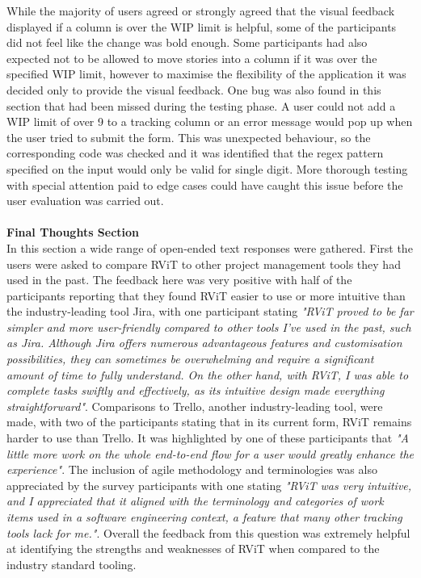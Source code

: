 \documentclass[l4proj.tex]{subfiles}
\begin{document}
While the majority of users agreed or strongly agreed that the visual feedback displayed if a column is over the WIP limit is helpful, some of the participants did not feel like the change was bold enough. Some participants had also expected not to be allowed to move stories into a column if it was over the specified WIP limit, however to maximise the flexibility of the application it was decided only to provide the visual feedback. One bug was also found in this section that had been missed during the testing phase. A user could not add a WIP limit of over 9 to a tracking column or an error message would pop up when the user tried to submit the form. This was unexpected behaviour, so the corresponding code was checked and it was identified that the regex pattern specified on the input would only be valid for single digit. More thorough testing with special attention paid to edge cases could have caught this issue before the user evaluation was carried out.\\
\\
\textbf{Final Thoughts Section}\\
In this section a wide range of open-ended text responses were gathered. First the users were asked to compare RViT to other project management tools they had used in the past. The feedback here was very positive with half of the participants reporting that they found RViT easier to use or more intuitive than the industry-leading tool Jira, with one participant stating \textit{"RViT proved to be far simpler and more user-friendly compared to other tools I've used in the past, such as Jira. Although Jira offers numerous advantageous features and customisation possibilities, they can sometimes be overwhelming and require a significant amount of time to fully understand. On the other hand, with RViT, I was able to complete tasks swiftly and effectively, as its intuitive design made everything straightforward"}. Comparisons to Trello, another industry-leading tool, were made, with two of the participants stating that in its current form, RViT remains harder to use than Trello. It was highlighted by one of these participants that \textit{"A little more work on the whole end-to-end flow for a user would greatly enhance the experience"}. The inclusion of agile methodology and terminologies was also appreciated by the survey participants with one stating \textit{"RViT was very intuitive, and I appreciated that it aligned with the terminology and categories of work items used in a software engineering context, a feature that many other tracking tools lack for me."}. Overall the feedback from this question was extremely helpful at identifying the strengths and weaknesses of RViT when compared to the industry standard tooling.
\end{document}
